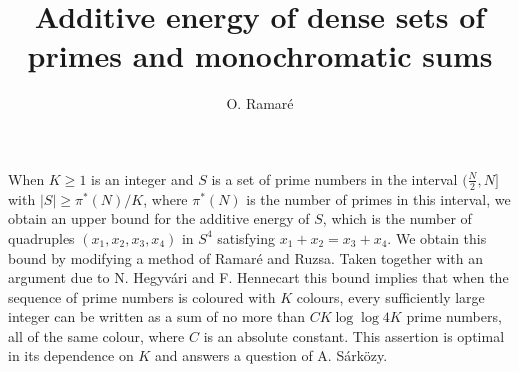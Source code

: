 \documentclass[12pt]{article}
\title{Additive energy of dense sets of primes and monochromatic sums}
\author{O. Ramar\'e}
\begin{document}

  When $K\geq 1$ is an integer and $S$ is a
       set of prime numbers in the interval $(\frac{N}{2},N]$ with $|S| \geq
       \pi^{*}(N)/K$, where $\pi^{*}(N)$ is the number of primes in this
       interval, we obtain an upper bound for the additive energy of $S$,
       which is the number of quadruples $(x_1,x_2,x_3,x_4)$ in $S^4$
       satisfying $x_1+x_2 = x_3+x_4$. We obtain this bound by modifying a
       method of Ramar{\'e} and Ruzsa. Taken together with an argument due to
       N. Hegyv{\'a}ri and F. Hennecart this bound implies that when the
       sequence of prime numbers is coloured with $K$ colours, every
       sufficiently large integer can be written as a sum of no more than $CK
       \log\log 4K$ prime numbers, all of the same colour, where $C$ is an
       absolute constant. This assertion is optimal in its dependence on $K$
       and answers a question of A. S{\'a}rk{\"o}zy.
\end{document}
